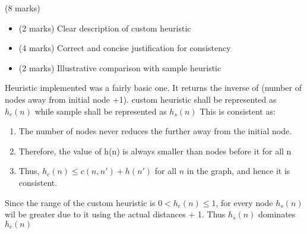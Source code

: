 \documentclass[12pt]{article}
\begin{document}
\begin{enumerate}[(a)]
\begin{markscheme} (8 marks)
\begin{itemize}
\item (2 marks) Clear description of custom heuristic
\item (4 marks) Correct and concise justification for consistency
\item (2 marks) Illustrative comparison with sample heuristic
\end{itemize}
\end{markscheme}

\begin{sol}
{\color{blue}
Heuristic implemented was a fairly basic one. It returns the inverse of (number of nodes away from initial node +1).
custom heuristic shall be represented as $h_c(n)$ while sample shall be represented as $h_s(n)$
\vspace{4pt}
This is consistent as:
\begin{enumerate}
\item The number of nodes never reduces the further away from the initial node. 
\item Therefore, the value of h(n) is always smaller than nodes before it for all n
\item Thus, $h_c(n) \leq c(n, n') + h(n')$ for all $n$ in the graph, and hence it is consistent.
\end{enumerate}

Since the range of the custom heuristic is  $0<h_c(n)\leq 1$, for every node $h_s(n)$ wil be greater due to it using the actual distances + 1. Thus $h_s(n)$ dominates $h_c(n)$
}
\end{sol}

\end{enumerate}
\end{document}
